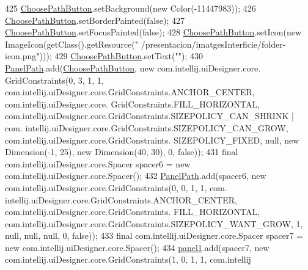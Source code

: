\begin{DoxyCode}
425         \hyperlink{classpresentacion_1_1form_1_1mainForm_a0f7073c8a28d814154d208bc924fedb4}{ChoosePathButton}.setBackground(\textcolor{keyword}{new} Color(-11447983));
426         \hyperlink{classpresentacion_1_1form_1_1mainForm_a0f7073c8a28d814154d208bc924fedb4}{ChoosePathButton}.setBorderPainted(\textcolor{keyword}{false});
427         \hyperlink{classpresentacion_1_1form_1_1mainForm_a0f7073c8a28d814154d208bc924fedb4}{ChoosePathButton}.setFocusPainted(\textcolor{keyword}{false});
428         \hyperlink{classpresentacion_1_1form_1_1mainForm_a0f7073c8a28d814154d208bc924fedb4}{ChoosePathButton}.setIcon(\textcolor{keyword}{new} ImageIcon(getClass().getResource(\textcolor{stringliteral}{"
      /presentacion/imatgesInterficie/folder-icon.png"})));
429         \hyperlink{classpresentacion_1_1form_1_1mainForm_a0f7073c8a28d814154d208bc924fedb4}{ChoosePathButton}.setText(\textcolor{stringliteral}{""});
430         \hyperlink{classpresentacion_1_1form_1_1mainForm_a0704eebe3c2e55cfd3b9344cca4d2d4b}{PanelPath}.add(\hyperlink{classpresentacion_1_1form_1_1mainForm_a0f7073c8a28d814154d208bc924fedb4}{ChoosePathButton}, \textcolor{keyword}{new} com.intellij.uiDesigner.core.
      GridConstraints(0, 3, 1, 1, com.intellij.uiDesigner.core.GridConstraints.ANCHOR\_CENTER, com.intellij.uiDesigner.core.
      GridConstraints.FILL\_HORIZONTAL, com.intellij.uiDesigner.core.GridConstraints.SIZEPOLICY\_CAN\_SHRINK | com.
      intellij.uiDesigner.core.GridConstraints.SIZEPOLICY\_CAN\_GROW, com.intellij.uiDesigner.core.GridConstraints.
      SIZEPOLICY\_FIXED, null, \textcolor{keyword}{new} Dimension(-1, 25), \textcolor{keyword}{new} Dimension(40, 30), 0, \textcolor{keyword}{false}));
431         \textcolor{keyword}{final} com.intellij.uiDesigner.core.Spacer spacer6 = \textcolor{keyword}{new} com.intellij.uiDesigner.core.Spacer();
432         \hyperlink{classpresentacion_1_1form_1_1mainForm_a0704eebe3c2e55cfd3b9344cca4d2d4b}{PanelPath}.add(spacer6, \textcolor{keyword}{new} com.intellij.uiDesigner.core.GridConstraints(0, 0, 1, 1, com.
      intellij.uiDesigner.core.GridConstraints.ANCHOR\_CENTER, com.intellij.uiDesigner.core.GridConstraints.
      FILL\_HORIZONTAL, com.intellij.uiDesigner.core.GridConstraints.SIZEPOLICY\_WANT\_GROW, 1, null, null, null, 0, \textcolor{keyword}{false}));
433         \textcolor{keyword}{final} com.intellij.uiDesigner.core.Spacer spacer7 = \textcolor{keyword}{new} com.intellij.uiDesigner.core.Spacer();
434         \hyperlink{classpresentacion_1_1form_1_1mainForm_aa43e009cc6dc09d4e637385fbd361510}{panel1}.add(spacer7, \textcolor{keyword}{new} com.intellij.uiDesigner.core.GridConstraints(1, 0, 1, 1, com.intellij

\end{DoxyCode}

